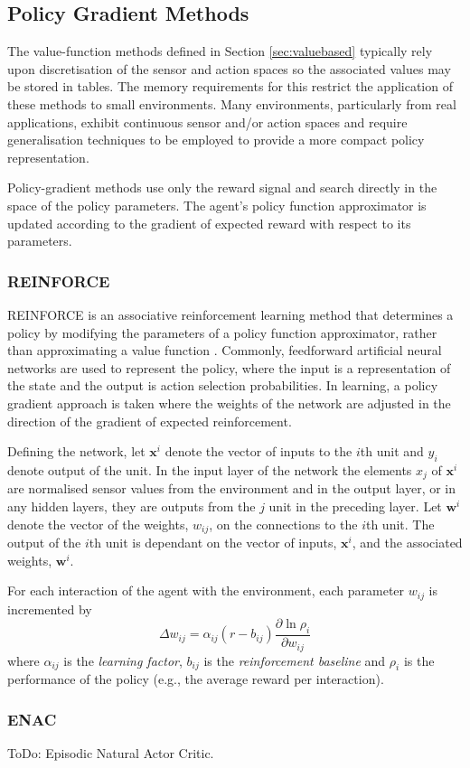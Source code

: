 \subsection{Policy Gradient Methods}
\label{sec:policybased}
The value-function methods defined in Section \ref{sec:valuebased} typically
rely upon discretisation of the sensor and action spaces so the associated
values may be stored in tables.  The memory requirements for this restrict the
application of these methods to small environments.  Many environments,
particularly from real applications, exhibit continuous sensor and/or action
spaces and require generalisation techniques to be employed to provide a more
compact policy representation.

Policy-gradient methods use only the reward signal and search directly in the
space of the policy parameters.  The agent's policy function approximator is
updated according to the gradient of expected reward with respect to its
parameters.

\subsubsection{REINFORCE}
\label{sec:reinforce}
REINFORCE is an associative reinforcement learning method that determines
a policy by modifying the parameters of a policy function approximator, rather
than approximating a value function \cite{williams:reinforce}.  Commonly,
feedforward artificial neural networks are used to represent the policy, where
the input is a representation of the state and the output is action selection
probabilities.  In learning, a policy gradient approach is taken where the
weights of the network are adjusted in the direction of the gradient of
expected reinforcement.

Defining the network, let $\mathbf{x}^i$ denote the vector of inputs to the
$i$th unit and $y_i$ denote output of the unit.  In the input layer of the
network the elements $x_j$ of $\mathbf{x}^i$ are normalised sensor values from
the environment and in the output layer, or in any hidden layers, they are
outputs from the $j$ unit in the preceding layer.  Let $\mathbf{w}^i$ denote
the vector of the weights, $w_{ij}$, on the connections to the $i$th unit.  The
output of the $i$th unit is dependant on the vector of inputs, $\mathbf{x}^i$,
and the associated weights, $\mathbf{w}^i$.

For each interaction of the agent with the environment, each parameter $w_{ij}$
is incremented by
\begin{equation}
\label{eq:reinforce}
\Delta w_{ij} = \alpha_{ij}(r - b_{ij})\frac{\partial\ln\rho_i}{\partial
w_{ij}}
\end{equation}
where $\alpha_{ij}$ is the \textit{learning factor}, $b_{ij}$ is the
\textit{reinforcement baseline} and $\rho_i$ is the performance of the policy
(e.g., the average reward per interaction).

\subsubsection{ENAC}
\label{sec:enac}
ToDo: Episodic Natural Actor Critic\cite{peters:enac}.

